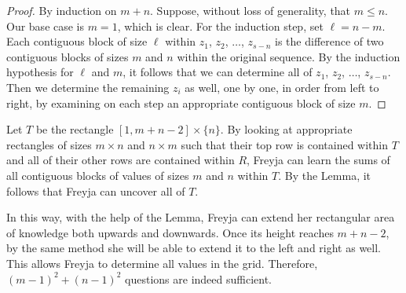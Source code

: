 \begin{proof}
  By induction on $m + n$. Suppose, without loss of generality, that $m \le n$.
  Our base case is $m = 1$, which is clear. For the induction step, set $\ell =
  n - m$. Each contiguous block of size $\ell$ within $z_1$, $z_2$, $\dots$,
  $z_{s - n}$ is the difference of two contiguous blocks of sizes $m$ and $n$
  within the original sequence. By the induction hypothesis for $\ell$ and $m$,
  it follows that we can determine all of $z_1$, $z_2$, $\dots$, $z_{s - n}$.
  Then we determine the remaining $z_i$ as well, one by one, in order from left
  to right, by examining on each step an appropriate contiguous block of size $m$.
\end{proof}

Let $T$ be the rectangle $[1, m + n - 2] \times \{n\}$. By looking at
appropriate rectangles of sizes $m \times n$ and $n \times m$ such that
their top row is contained within $T$ and all of their other rows are
contained within $R$, Freyja can learn the sums of all contiguous blocks of
values of sizes $m$ and $n$ within $T$. By the Lemma, it follows that Freyja
can uncover all of $T$.

In this way, with the help of the Lemma, Freyja can extend her rectangular area
of knowledge both upwards and downwards. Once its height reaches $m + n -
2$, by the same method she will be able to extend it to the left and right as
well. This allows Freyja to determine all values in the grid. Therefore, $(m -
1)^2 + (n - 1)^2$ questions are indeed sufficient.

